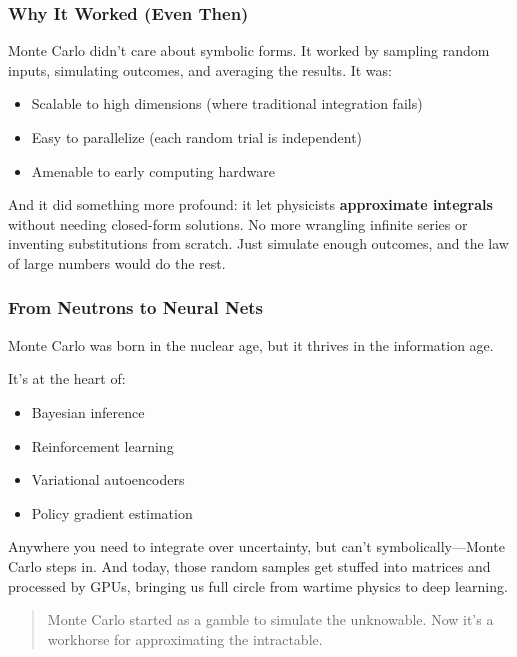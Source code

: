 \subsubsection{Why It Worked (Even Then)}

Monte Carlo didn’t care about symbolic forms. It worked by sampling random inputs, simulating outcomes, and averaging the results. It was:

\begin{itemize}
  \item Scalable to high dimensions (where traditional integration fails)
  \item Easy to parallelize (each random trial is independent)
  \item Amenable to early computing hardware
\end{itemize}

And it did something more profound: it let physicists \textbf{approximate integrals} without needing closed-form solutions. No more wrangling infinite series or inventing substitutions from scratch. Just simulate enough outcomes, and the law of large numbers would do the rest.

\subsubsection{From Neutrons to Neural Nets}

Monte Carlo was born in the nuclear age, but it thrives in the information age.

It’s at the heart of:

\begin{itemize}
  \item Bayesian inference
  \item Reinforcement learning
  \item Variational autoencoders
  \item Policy gradient estimation
\end{itemize}

Anywhere you need to integrate over uncertainty, but can't symbolically—Monte Carlo steps in. And today, those random samples get stuffed into matrices and processed by GPUs, bringing us full circle from wartime physics to deep learning.

\begin{quote}
Monte Carlo started as a gamble to simulate the unknowable.  
Now it’s a workhorse for approximating the intractable.
\end{quote}




